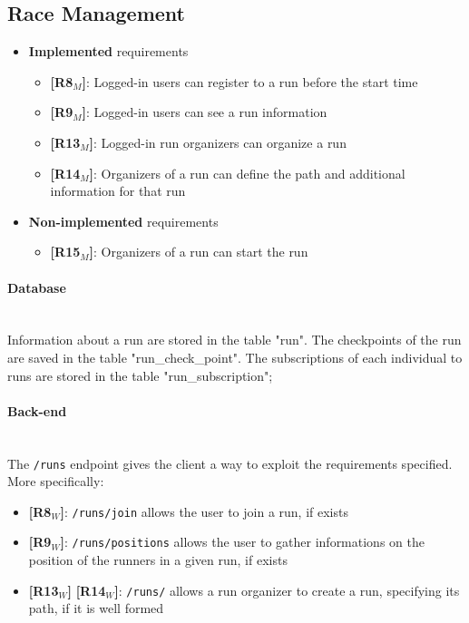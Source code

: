 \subsection{Race Management}
\begin{itemize}
    \item \textbf{Implemented} requirements
        \begin{itemize}
    \item \textbf{[R8$_M$]}: Logged-in users can register to a run before the start time
    \item \textbf{[R9$_M$]}: Logged-in users can see a run information
    \item \textbf{[R13$_M$]}: Logged-in run organizers can organize a run
    \item \textbf{[R14$_M$]}: Organizers of a run can define the path and additional information for that run

        \end{itemize}
    \item \textbf{Non-implemented} requirements
    \begin{itemize}
            \item \textbf{[R15$_M$]}: Organizers of a run can start the run
        \end{itemize}
\end{itemize}

\paragraph{Database} \mbox{}\\
Information about a run are stored in the table "run". The checkpoints of the run are saved in the table "run\_check\_point". The subscriptions of each individual to runs are stored in the table "run\_subscription";
\paragraph{Back-end} \mbox{}\\
The \texttt{/runs} endpoint gives the client a way to exploit the requirements specified.
More specifically: 
\begin{itemize}
    \item \textbf{[R8$_W$]}: \texttt{/runs/join} allows the user to join a run, if exists
    \item \textbf{[R9$_W$]}: \texttt{/runs/positions} allows the user to gather informations on the position of the runners in a given run, if exists
    \item \textbf{[R13$_W$]}  \textbf{[R14$_W$]}: \texttt{/runs/} allows a run organizer to create a run, specifying its path, if it is well formed
\end{itemize}
